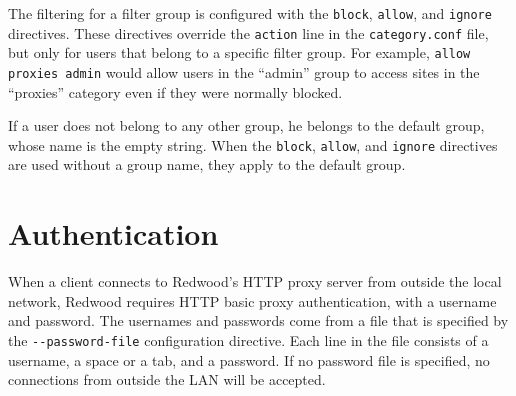 \documentclass{article}
\begin{document}
The filtering for a filter group is configured with the \verb"block", \verb"allow", and \verb"ignore"
directives. These directives override the \verb"action" line in the \verb"category.conf" file,
but only for users that belong to a specific filter group.
For example, \verb"allow proxies admin" would allow users in the ``admin'' group
to access sites in the ``proxies'' category even if they were normally blocked.

If a user does not belong to any other group, he belongs to the default group,
whose name is the empty string.
When the \verb"block", \verb"allow", and \verb"ignore" directives are used without a group name,
they apply to the default group.

\section{Authentication}

When a client connects to Redwood's HTTP proxy server from outside the local network,
Redwood requires HTTP basic proxy authentication, with a username and password.
The usernames and passwords come from a file that is specified by the \verb"--password-file"
configuration directive. Each line in the file consists of a username,
a space or a tab, and a password.
If no password file is specified, no connections from outside the LAN will be accepted.
\end{document}
